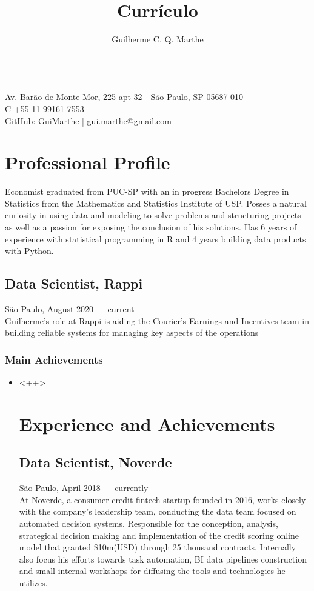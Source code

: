 \documentclass{article}
\author{Guilherme C. Q. Marthe}
\title{Currículo}
\makeatletter
\renewcommand{\maketitle}{
\begin{flushleft}
	{\huge\theauthor}
	\vspace{0.2em}\\
	Av. Barão de Monte Mor, 225 apt 32 - São Paulo, SP 05687-010\\
	C +55 11 99161-7553\\
	GitHub: GuiMarthe | \href{mailto:gui.marthe@gmail.com}{gui.marthe@gmail.com}
\end{flushleft}
}
\newcommand{\jobdate}[3]{
\large
\vspace{0.05em} 
  {#1, #2 --- #3}
\vspace{0.5em} 
\\
}
\makeatother
\begin{document}
\maketitle

\section{Professional Profile}

 \linespread{.99}\large{Economist graduated from PUC-SP with an in progress Bachelors Degree in Statistics from the Mathematics and Statistics Institute of USP. Posses a natural curiosity in using data and modeling to solve problems and structuring projects as well as a passion for exposing the conclusion of his solutions. Has 6 years of experience with statistical programming in R and 4 years building data products with Python.

\subsection{Data Scientist, Rappi}
\jobdate{São Paulo}{August 2020}{current}

Guilherme's role at Rappi is aiding the Courier's Earnings and Incentives team in building reliable systems for managing key aspects of the operations

\subsubsection{Main Achievements}

\begin{itemize}

\item{<++>}

\section{Experience and Achievements}

\subsection{Data Scientist, Noverde}
\jobdate{São Paulo}{April 2018}{currently}
At Noverde, a consumer credit fintech startup founded in 2016, works closely with the company's leadership team, conducting the data team focused on automated decision systems. Responsible for the conception, analysis, strategical decision making and implementation of the credit scoring online model that granted \$10m(USD) through 25 thousand contracts. Internally also focus his efforts towards task automation, BI data pipelines construction and small internal workshops for diffusing the tools and technologies he utilizes.


\end{itemize}}
\end{document}
